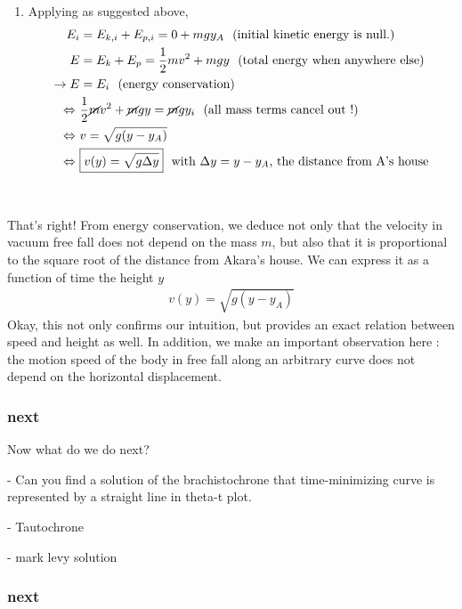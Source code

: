 \documentclass{article}
\begin{document}
\begin{tcolorbox}
\begin{enumerate}
\item Applying as suggested above,
\begin{align}
E_i &= E_{k,i} + E_{p,i}  = 0 + mgy_A ~~\text{(initial kinetic energy is null.)}\nonumber\\
E &= E_{k} + E_{p} = \frac 12  mv^2 + m g y ~~\text{(total energy when anywhere else)}\nonumber\\
\rightarrow E &= E_i \nonumber~~\text{(energy conservation)} \\
\Leftrightarrow~& \frac 12  \cancel{m}v^2 + \cancel{m} g y = \cancel{m}gy_i~~\text{(all mass terms cancel out !)}\nonumber \\
\Leftrightarrow~& v = \sqrt{g (y - y_A)}\nonumber\\
\Leftrightarrow~& \boxed{v(y) = \sqrt{g \Delta y}}\nonumber ~~\text{with $\Delta y=y - y_A$, the distance from A's house}
\end{align}

\end{enumerate}
\end{tcolorbox}
~

That's right! From energy conservation, we deduce not only that the velocity in vacuum free fall does not depend on the mass $m$, but also that it is proportional to the square root of the distance from Akara's house. We can express it as a function of time the height $y$
\begin{align}
  \boxed{v(y) = \sqrt{g (y - y_A)}}
\end{align}
Okay, this not only confirms our intuition, but provides an exact relation between speed and height as well. In addition, we make an important observation here : the motion speed of the body in free fall along an arbitrary curve does not depend on the horizontal displacement.

\subsubsection*{next}




Now what do we do next?


- Can you find a solution of the brachistochrone that time-minimizing curve is represented by a straight line in theta-t plot.

- Tautochrone

- mark levy solution


\subsubsection*{next}
\end{document}
